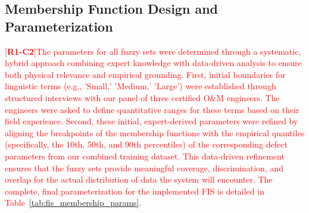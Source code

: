 \documentclass[energies,supfile,submit,pdftex,moreauthors]{Definitions/mdpi}
\newcommand{\revtag}[2]{[\textbf{R#1-C#2}]}
\newcommand{\Rone}[1]{\textcolor{red}{#1}}
\begin{document}
\subsection{Membership Function Design and Parameterization}
\Rone{\revtag{1}{2}The parameters for all fuzzy sets were determined through a systematic, hybrid approach combining expert knowledge with data-driven analysis to ensure both physical relevance and empirical grounding. First, initial boundaries for linguistic terms (e.g., 'Small,' 'Medium,' 'Large') were established through structured interviews with our panel of three certified O\&M engineers. The engineers were asked to define quantitative ranges for these terms based on their field experience. Second, these initial, expert-derived parameters were refined by aligning the breakpoints of the membership functions with the empirical quantiles (specifically, the 10th, 50th, and 90th percentiles) of the corresponding defect parameters from our combined training dataset. This data-driven refinement ensures that the fuzzy sets provide meaningful coverage, discrimination, and overlap for the actual distribution of data the system will encounter. The complete, final parameterization for the implemented FIS is detailed in Table~\ref{tab:fis_membership_params}.}
\end{document}
